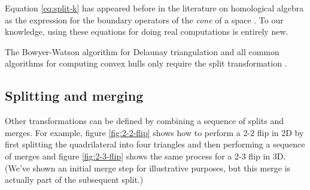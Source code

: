 \documentclass[twocolumn]{article}
\begin{document}
Equation \eqref{eq:split-k} has appeared before in the literature on homological algebra as the expression for the boundary operators of the \emph{cone} of a space \cite{gelfand1994homological}.
To our knowledge, using these equations for doing real computations is entirely new.

The Bowyer-Watson algorithm for Delaunay triangulation and all common algorithms for computing convex hulls only require the split transformation \cite{cheng2013delaunay}.

\subsection{Splitting and merging}

Other transformations can be defined by combining a sequence of splits and merges.
For example, figure \ref{fig:2-2-flip} shows how to perform a 2-2 flip in 2D by first splitting the quadrilateral into four triangles and then performing a sequence of merges and figure \ref{fig:2-3-flip} shows the same process for a 2-3 flip in 3D.
(We've shown an initial merge step for illustrative purposes, but this merge is actually part of the subsequent split.)
\end{document}

